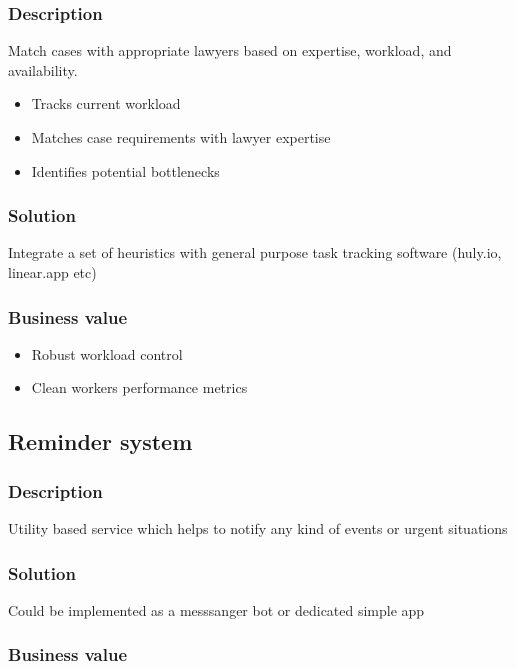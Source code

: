 \documentclass[11pt]{article}
\begin{document}
\subsubsection{Description}
\label{sec:org1ccec28}

Match cases with appropriate lawyers based on expertise, workload, and availability.
\begin{itemize}
\item Tracks current workload
\item Matches case requirements with lawyer expertise
\item Identifies potential bottlenecks
\end{itemize}
\subsubsection{Solution}
\label{sec:org97d3860}

Integrate a set of heuristics with general purpose task tracking software (huly.io, linear.app etc)
\subsubsection{Business value}
\label{sec:orgea962fc}

\begin{itemize}
\item Robust workload control
\item Clean workers performance metrics
\end{itemize}
\subsection{Reminder system}
\label{sec:orge5fc5ca}

\subsubsection{Description}
\label{sec:org9ba10cc}

Utility based service which helps to notify any kind of events or urgent situations
\subsubsection{Solution}
\label{sec:orgc55c24c}

Could be implemented as a messsanger bot or dedicated simple app
\subsubsection{Business value}
\label{sec:org606447e}
\end{document}
